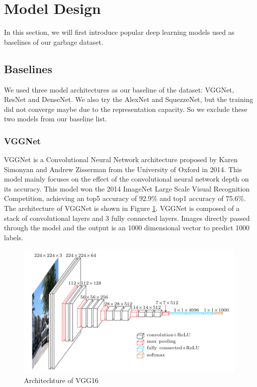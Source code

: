 \section{Model Design}

In this section, we will first introduce popular deep learning models used as baselines of our garbage dataset.

\subsection{Baselines}

We used three model architectures as our baseline of the dataset: VGGNet\cite{vgg2014}, ResNet\cite{resnet2016} and DenseNet\cite{densenet2017}. We also try the AlexNet\cite{alexnet} and SquezzeNet\cite{squeezenet2016}, but the training did not converge maybe due to the representation capacity. So we exclude these two models from our baseline list.

\subsubsection{VGGNet}

VGGNet is a Convolutional Neural Network architecture proposed by Karen Simonyan and Andrew Zisserman from the University of Oxford in 2014\cite{vgg2014}. This model mainly focuses on the effect of the convolutional neural network depth on its accuracy. This model won the 2014 ImageNet Large Scale Visual Recognition Competition, achieving an top5 accuracy of 92.9\% and top1 accuracy of 75.6\%. The architecture of VGGNet is shown in Figure \ref{fig:vgg}. VGGNet is composed of a stack of convolutional layers and 3 fully connected layers. Images directly passed through the model and the output is an 1000 dimensional vector to predict 1000 labels.
\begin{figure}[ht]
	\centering
	\includegraphics[scale=1.]{figs/vgg16.png}
	\caption{Architechture of VGG16\cite{vgg_arch}}
	\label{fig:vgg}
\end{figure}

